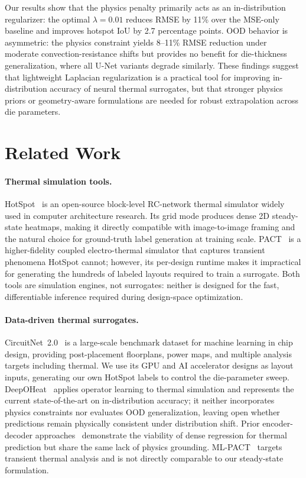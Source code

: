\documentclass[10pt,twocolumn,letterpaper]{article}
\begin{document}
Our results show that the physics penalty primarily acts as an
in-distribution regularizer: the optimal $\lambda{=}0.01$ reduces
RMSE by 11\% over the MSE-only baseline and improves hotspot IoU by
2.7 percentage points. OOD behavior is asymmetric: the physics
constraint yields 8--11\% RMSE reduction under moderate
convection-resistance shifts but provides no benefit for
die-thickness generalization, where all U-Net variants degrade
similarly. These findings suggest that lightweight Laplacian
regularization is a practical tool for improving in-distribution
accuracy of neural thermal surrogates, but that stronger physics
priors or geometry-aware formulations are needed for robust
extrapolation across die parameters.

\section{Related Work}

\paragraph{Thermal simulation tools.}
HotSpot~\cite{HotSpot} is an open-source block-level RC-network
thermal simulator widely used in computer architecture research. Its
grid mode produces dense 2D steady-state heatmaps, making it directly
compatible with image-to-image framing and the natural choice for
ground-truth label generation at training scale. PACT~\cite{PACT}
is a higher-fidelity coupled electro-thermal simulator that captures
transient phenomena HotSpot cannot; however, its per-design runtime
makes it impractical for generating the hundreds of labeled layouts
required to train a surrogate. Both tools are simulation engines, not
surrogates: neither is designed for the fast, differentiable inference
required during design-space optimization.

\paragraph{Data-driven thermal surrogates.}
CircuitNet~2.0~\cite{CircuitNet2} is a large-scale benchmark dataset
for machine learning in chip design, providing post-placement
floorplans, power maps, and multiple analysis targets including
thermal. We use its GPU and AI accelerator designs as layout inputs,
generating our own HotSpot labels to control the die-parameter sweep.
DeepOHeat~\cite{DeepOHeat} applies operator learning to thermal
simulation and represents the current state-of-the-art on
in-distribution accuracy; it neither incorporates physics constraints
nor evaluates OOD generalization, leaving open whether predictions
remain physically consistent under distribution shift. Prior
encoder-decoder approaches~\cite{EncoderDecoderThermal} demonstrate
the viability of dense regression for thermal prediction but share
the same lack of physics grounding. ML-PACT~\cite{MLPACT} targets
transient thermal analysis and is not directly comparable to our
steady-state formulation.
\end{document}

